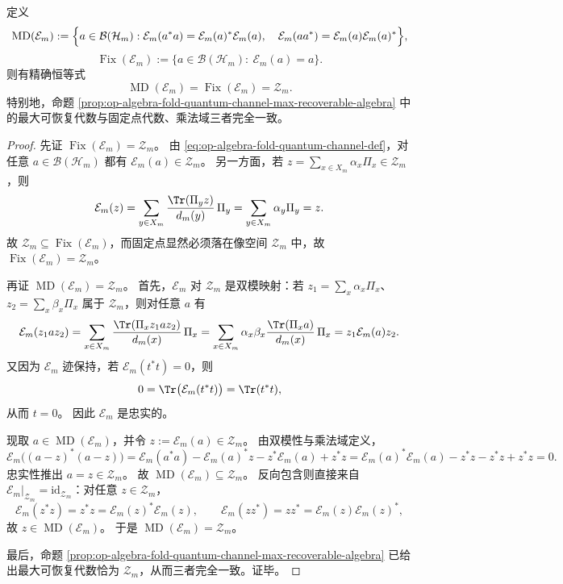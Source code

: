 \begin{theorem}\label{thm:op-algebra-fold-quantum-channel-md-fix-recoverable}
定义
\[
\operatorname{MD}(\mathcal{E}_m)
:=
\Bigl\{
a\in\mathcal{B}(\mathcal{H}_m):
\mathcal{E}_m(a^\ast a)=\mathcal{E}_m(a)^\ast\mathcal{E}_m(a),\quad
\mathcal{E}_m(aa^\ast)=\mathcal{E}_m(a)\mathcal{E}_m(a)^\ast
\Bigr\},
\]
\[
\operatorname{Fix}(\mathcal{E}_m)
:=
\bigl\{
a\in\mathcal{B}(\mathcal{H}_m):\ \mathcal{E}_m(a)=a
\bigr\}.
\]
则有精确恒等式
\[
\operatorname{MD}(\mathcal{E}_m)
=
\operatorname{Fix}(\mathcal{E}_m)
=
\mathcal{Z}_m.
\]
特别地，命题 \ref{prop:op-algebra-fold-quantum-channel-max-recoverable-algebra} 中的最大可恢复代数与固定点代数、乘法域三者完全一致。
\end{theorem}
\begin{proof}
先证 \(\operatorname{Fix}(\mathcal{E}_m)=\mathcal{Z}_m\)。
由 \eqref{eq:op-algebra-fold-quantum-channel-def}，对任意 \(a\in\mathcal{B}(\mathcal{H}_m)\) 都有 \(\mathcal{E}_m(a)\in\mathcal{Z}_m\)。
另一方面，若 \(z=\sum_{x\in X_m}\alpha_x\Pi_x\in\mathcal{Z}_m\)，则
\[
\mathcal{E}_m(z)
=
\sum_{y\in X_m}\frac{\Tr(\Pi_y z)}{d_m(y)}\,\Pi_y
=
\sum_{y\in X_m}\alpha_y\Pi_y
=
z.
\]
故 \(\mathcal{Z}_m\subseteq \operatorname{Fix}(\mathcal{E}_m)\)，而固定点显然必须落在像空间 \(\mathcal{Z}_m\) 中，故
\(
\operatorname{Fix}(\mathcal{E}_m)=\mathcal{Z}_m
\)。

再证 \(\operatorname{MD}(\mathcal{E}_m)=\mathcal{Z}_m\)。
首先，\(\mathcal{E}_m\) 对 \(\mathcal{Z}_m\) 是双模映射：若
\(
z_1=\sum_x\alpha_x\Pi_x
\)、
\(
z_2=\sum_x\beta_x\Pi_x
\)
属于 \(\mathcal{Z}_m\)，则对任意 \(a\) 有
\[
\mathcal{E}_m(z_1 a z_2)
=
\sum_{x\in X_m}\frac{\Tr(\Pi_x z_1 a z_2)}{d_m(x)}\,\Pi_x
=
\sum_{x\in X_m}\alpha_x\beta_x\frac{\Tr(\Pi_x a)}{d_m(x)}\,\Pi_x
=
z_1\mathcal{E}_m(a)z_2.
\]
又因为 \(\mathcal{E}_m\) 迹保持，若 \(\mathcal{E}_m(t^\ast t)=0\)，则
\[
0=\Tr\bigl(\mathcal{E}_m(t^\ast t)\bigr)=\Tr(t^\ast t),
\]
从而 \(t=0\)。
因此 \(\mathcal{E}_m\) 是忠实的。

现取 \(a\in\operatorname{MD}(\mathcal{E}_m)\)，并令 \(z:=\mathcal{E}_m(a)\in\mathcal{Z}_m\)。
由双模性与乘法域定义，
\[
\mathcal{E}_m\bigl((a-z)^\ast(a-z)\bigr)
=
\mathcal{E}_m(a^\ast a)-\mathcal{E}_m(a)^\ast z-z^\ast \mathcal{E}_m(a)+z^\ast z
=
\mathcal{E}_m(a)^\ast\mathcal{E}_m(a)-z^\ast z-z^\ast z+z^\ast z
=
0.
\]
忠实性推出 \(a=z\in\mathcal{Z}_m\)。
故 \(\operatorname{MD}(\mathcal{E}_m)\subseteq \mathcal{Z}_m\)。
反向包含则直接来自 \(\mathcal{E}_m|_{\mathcal{Z}_m}=\mathrm{id}_{\mathcal{Z}_m}\)：对任意 \(z\in\mathcal{Z}_m\)，
\[
\mathcal{E}_m(z^\ast z)=z^\ast z=\mathcal{E}_m(z)^\ast\mathcal{E}_m(z),
\qquad
\mathcal{E}_m(zz^\ast)=zz^\ast=\mathcal{E}_m(z)\mathcal{E}_m(z)^\ast,
\]
故 \(z\in\operatorname{MD}(\mathcal{E}_m)\)。
于是 \(\operatorname{MD}(\mathcal{E}_m)=\mathcal{Z}_m\)。

最后，命题 \ref{prop:op-algebra-fold-quantum-channel-max-recoverable-algebra} 已给出最大可恢复代数恰为 \(\mathcal{Z}_m\)，从而三者完全一致。证毕。
\end{proof}
